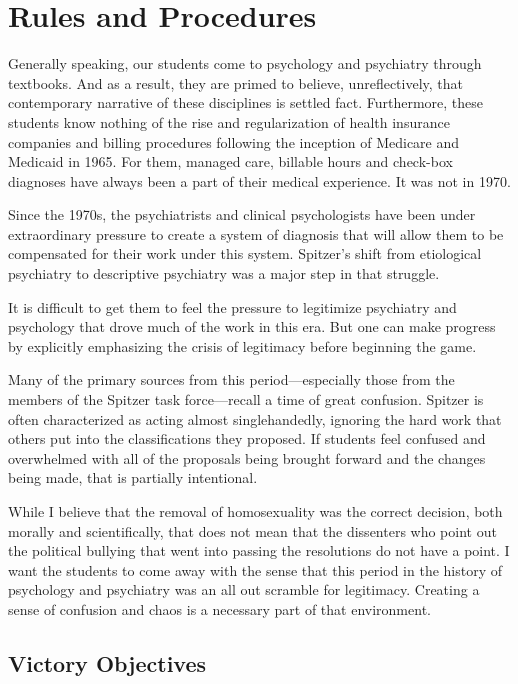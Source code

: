 \section{Rules and Procedures}
\label{rulesandprocedures}

Generally speaking, our students come to psychology and psychiatry through textbooks. And as a result, they are primed to believe, unreflectively, that contemporary narrative of these disciplines is settled fact. Furthermore, these students know nothing of the rise and regularization of health insurance companies and billing procedures following the inception of Medicare and Medicaid in 1965. For them, managed care, billable hours and check-box diagnoses have always been a part of their medical experience. It was not in 1970. 

Since the 1970s, the psychiatrists and clinical psychologists have been under extraordinary pressure to create a system of diagnosis that will allow them to be compensated for their work under this system. Spitzer's shift from etiological psychiatry to descriptive psychiatry was a major step in that struggle. 

It is difficult to get them to feel the pressure to legitimize psychiatry and psychology that drove much of the work in this era. But one can make progress by explicitly emphasizing the crisis of legitimacy before beginning the game.

Many of the primary sources from this period---especially those from the members of the Spitzer task force---recall a time of great confusion. Spitzer is often characterized as acting almost singlehandedly, ignoring the hard work that others put into the classifications they proposed. If students feel confused and overwhelmed with all of the proposals being brought forward and the changes being made, that is partially intentional. 

While I believe that the removal of homosexuality was the correct decision, both morally and scientifically, that does not mean that the dissenters who point out the political bullying that went into passing the resolutions do not have a point. I want the students to come away with the sense that this period in the history of psychology and psychiatry was an all out scramble for legitimacy. Creating a sense of confusion and chaos is a necessary part of that environment.

\subsection{Victory Objectives}
\label{victoryobjectives}

